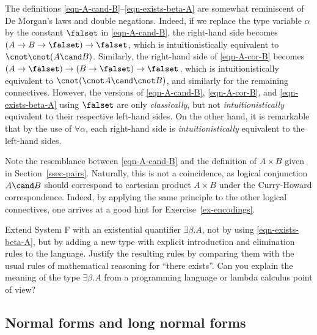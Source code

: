 \documentclass[12pt]{article}
\begin{document}
\begin{remark}
  The definitions {\eqref{eqn-A-cand-B}}--{\eqref{eqn-exists-beta-A}}
  are somewhat reminiscent of De Morgan's laws and double negations.
  Indeed, if we replace the type variable $\alpha$ by the constant
  $\falset$ in {\eqref{eqn-A-cand-B}}, the right-hand side becomes
  $(A\to B\to\falset)\to\falset$, which is intuitionistically
  equivalent to $\cnot\cnot(A\cand B)$. Similarly, the right-hand side
  of {\eqref{eqn-A-cor-B}} becomes
  $(A\to\falset)\to(B\to\falset)\to\falset$, which is
  intuitionistically equivalent to $\cnot(\cnot A\cand\cnot B)$, and
  similarly for the remaining connectives. However, the versions of
  {\eqref{eqn-A-cand-B}}, {\eqref{eqn-A-cor-B}}, and
  {\eqref{eqn-exists-beta-A}} using $\falset$ are only {\em
    classically}, but not {\em intuitionistically} equivalent to
  their respective left-hand sides. On the other hand, it is
  remarkable that by the use of $\forall\alpha$, each right-hand
  side is {\em intuitionistically} equivalent to the left-hand sides.
\end{remark}

\begin{remark}
  Note the resemblance between {\eqref{eqn-A-cand-B}} and the
  definition of $A\times B$ given in Section~\ref{ssec-pairs}.
  Naturally, this is not a coincidence, as logical conjunction $A\cand
  B$ should correspond to cartesian product $A\times B$ under the
  Curry-Howard correspondence. Indeed, by applying the same principle
  to the other logical connectives, one arrives at a good hint for
  Exercise~\ref{ex-encodings}.
\end{remark}

\begin{exercise}
  Extend System F with an existential quantifier $\exists\beta.A$, not
  by using {\eqref{eqn-exists-beta-A}}, but by adding a new type with
  explicit introduction and elimination rules to the language. Justify
  the resulting rules by comparing them with the usual rules of
  mathematical reasoning for ``there exists''. Can you explain the
  meaning of the type $\exists\beta.A$ from a programming language or
  lambda calculus point of view?
\end{exercise}

\subsection{Normal forms and long normal forms}
\end{document}
